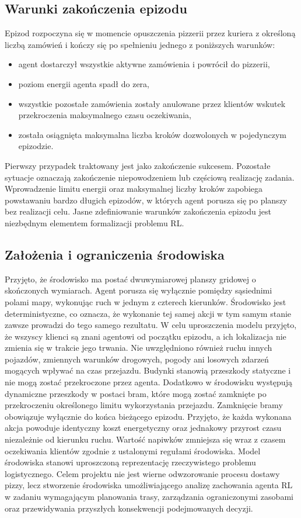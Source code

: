 \documentclass[12pt]{article}
\begin{document}
\subsection{Warunki zakończenia epizodu}

Epizod rozpoczyna się w momencie opuszczenia pizzerii przez kuriera z określoną liczbą zamówień i kończy się po spełnieniu jednego z poniższych warunków:
\begin{itemize} \item agent dostarczył wszystkie aktywne zamówienia i powrócił do pizzerii, \item poziom energii agenta spadł do zera, \item wszystkie pozostałe zamówienia zostały anulowane przez klientów wskutek przekroczenia maksymalnego czasu oczekiwania, \item została osiągnięta maksymalna liczba kroków dozwolonych w pojedynczym epizodzie. \end{itemize}
Pierwszy przypadek traktowany jest jako zakończenie sukcesem. Pozostałe sytuacje oznaczają zakończenie niepowodzeniem lub częściową realizację zadania. Wprowadzenie limitu energii oraz maksymalnej liczby kroków zapobiega powstawaniu bardzo długich epizodów, w których agent porusza się po planszy bez realizacji celu. Jasne zdefiniowanie warunków zakończenia epizodu jest niezbędnym elementem formalizacji problemu RL.

\subsection{Założenia i ograniczenia środowiska} Przyjęto, że środowisko ma postać dwuwymiarowej planszy gridowej o skończonych wymiarach. Agent porusza się wyłącznie pomiędzy sąsiednimi polami mapy, wykonując ruch w jednym z czterech kierunków. Środowisko jest deterministyczne, co oznacza, że wykonanie tej samej akcji w tym samym stanie zawsze prowadzi do tego samego rezultatu. W celu uproszczenia modelu przyjęto, że wszyscy klienci są znani agentowi od początku epizodu, a ich lokalizacja nie zmienia się w trakcie jego trwania. Nie uwzględniono również ruchu innych pojazdów, zmiennych warunków drogowych, pogody ani losowych zdarzeń mogących wpływać na czas przejazdu. Budynki stanowią przeszkody statyczne i nie mogą zostać przekroczone przez agenta. Dodatkowo w środowisku występują dynamiczne przeszkody w postaci bram, które mogą zostać zamknięte po przekroczeniu określonego limitu wykorzystania przejazdu. Zamknięcie bramy obowiązuje wyłącznie do końca bieżącego epizodu. Przyjęto, że każda wykonana akcja powoduje identyczny koszt energetyczny oraz jednakowy przyrost czasu niezależnie od kierunku ruchu. Wartość napiwków zmniejsza się wraz z czasem oczekiwania klientów zgodnie z ustalonymi regułami środowiska. Model środowiska stanowi uproszczoną reprezentację rzeczywistego problemu logistycznego. Celem projektu nie jest wierne odwzorowanie procesu dostawy pizzy, lecz stworzenie środowiska umożliwiającego analizę zachowania agenta RL w zadaniu wymagającym planowania trasy, zarządzania ograniczonymi zasobami oraz przewidywania przyszłych konsekwencji podejmowanych decyzji.
\end{document}
